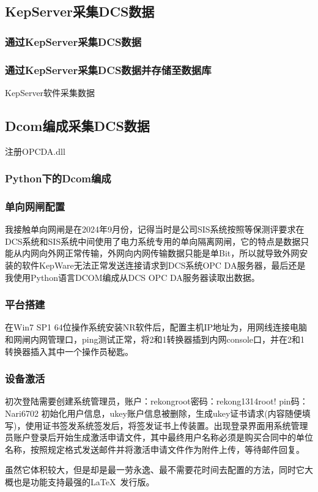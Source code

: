 \subsection{KepServer采集DCS数据}
\subsubsection{通过KepServer采集DCS数据}
\subsubsection{通过KepServer采集DCS数据并存储至数据库}
KepServer软件采集数据
\subsection{Dcom编成采集DCS数据}
注册OPCDA.dll
\subsubsection{Python下的Dcom编成}
\subsubsection{单向网闸配置}
我接触单向网闸是在2024年9月份，记得当时是公司SIS系统按照等保测评要求在DCS系统和SIS系统中间使用了电力系统专用的单向隔离网闸，它的特点是数据只能从内网向外网正常传输，外网向内网传输数据只能是单Bit，所以就导致外网安装的软件KepWare无法正常发送连接请求到DCS系统OPC DA服务器，最后还是我使用Python语言DCOM编成从DCS OPC DA服务器读取出数据。
\subsubsection{平台搭建}
在Win7 SP1 64位操作系统安装NR软件后，配置主机IP地址为，用网线连接电脑和网闸内网管理口，ping测试正常，将2和1转换器插到内网console口，并在2和1转换器插入其中一个操作员秘匙。
\subsubsection{设备激活}
初次登陆需要创建系统管理员，账户：rekongroot密码：rekong1314root! pin码：Nari6702
初始化用户信息，ukey账户信息被删除，生成ukey证书请求(内容随便填写)，使用证书签发系统签发后，将签发证书上传装置。出现登录界面用系统管理员账户登录后开始生成激活申请文件，其中最终用户名称必须是购买合同中的单位名称，按照规定格式发送邮件并将激活申请文件作为附件上传，等待邮件回复。


虽然它体积较大，但是却是最一劳永逸、最不需要花时间去配置的方法，同时它大概也是功能支持最强的\LaTeX\ 发行版。

